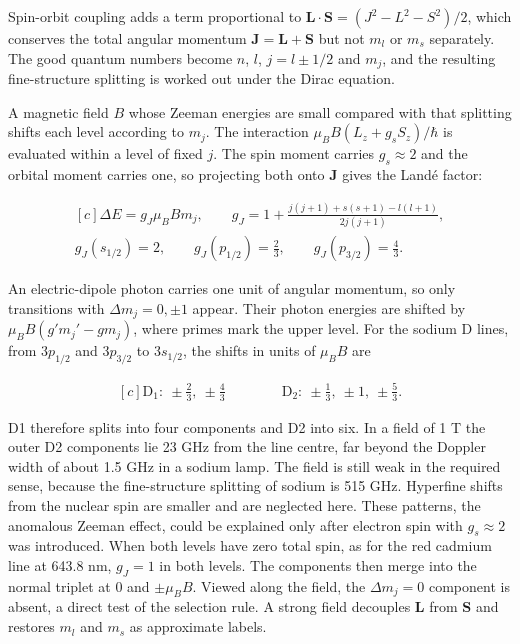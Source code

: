 \documentclass[11pt,oneside]{book}
\newenvironment{centeredalign}{\[\begin{gathered}[c]}{\end{gathered}\]}
\begin{document}
Spin-orbit coupling adds a term proportional to \(\mathbf L\cdot\mathbf S=(J^2-L^2-S^2)/2\), which conserves the total angular momentum \(\mathbf J=\mathbf L+\mathbf S\) but not \(m_l\) or \(m_s\) separately. The good quantum numbers become \(n\), \(l\), \(j=l\pm1/2\) and \(m_j\), and the resulting fine-structure splitting is worked out under the Dirac equation.

A magnetic field \(B\) whose Zeeman energies are small compared with that splitting shifts each level according to \(m_j\). The interaction \(\mu_BB(L_z+g_sS_z)/\hbar\) is evaluated within a level of fixed \(j\). The spin moment carries \(g_s\approx2\) and the orbital moment carries one, so projecting both onto \(\mathbf J\) gives the Landé factor:

\begin{centeredalign}
\Delta E=g_J\mu_BBm_j,\qquad g_J=1+\frac{j(j+1)+s(s+1)-l(l+1)}{2j(j+1)},\\
g_J(s_{1/2})=2,\qquad g_J(p_{1/2})=\tfrac23,\qquad g_J(p_{3/2})=\tfrac43.
\end{centeredalign}

An electric-dipole photon carries one unit of angular momentum, so only transitions with \(\Delta m_j=0,\pm1\) appear. Their photon energies are shifted by \(\mu_BB(g'm_j'-gm_j)\), where primes mark the upper level. For the sodium D lines, from \(3p_{1/2}\) and \(3p_{3/2}\) to \(3s_{1/2}\), the shifts in units of \(\mu_BB\) are

\begin{centeredalign}
\mathrm{D}_1:\ \pm\tfrac23,\ \pm\tfrac43\qquad\qquad \mathrm{D}_2:\ \pm\tfrac13,\ \pm1,\ \pm\tfrac53.
\end{centeredalign}

D1 therefore splits into four components and D2 into six. In a field of 1 T the outer D2 components lie 23 GHz from the line centre, far beyond the Doppler width of about 1.5 GHz in a sodium lamp. The field is still weak in the required sense, because the fine-structure splitting of sodium is 515 GHz. Hyperfine shifts from the nuclear spin are smaller and are neglected here. These patterns, the anomalous Zeeman effect, could be explained only after electron spin with \(g_s\approx2\) was introduced. When both levels have zero total spin, as for the red cadmium line at 643.8 nm, \(g_J=1\) in both levels. The components then merge into the normal triplet at \(0\) and \(\pm\mu_BB\). Viewed along the field, the \(\Delta m_j=0\) component is absent, a direct test of the selection rule. A strong field decouples \(\mathbf L\) from \(\mathbf S\) and restores \(m_l\) and \(m_s\) as approximate labels.
\end{document}
